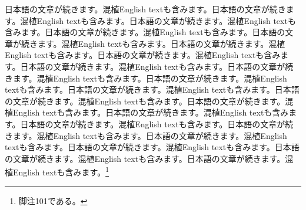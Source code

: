 \documentclass[pdflatex,book]{jlreq}
\begin{document}
日本語の文章が続きます。混植English textも含みます。日本語の文章が続きます。混植English textも含みます。日本語の文章が続きます。混植English textも含みます。日本語の文章が続きます。混植English textも含みます。日本語の文章が続きます。混植English textも含みます。日本語の文章が続きます。混植English textも含みます。日本語の文章が続きます。混植English textも含みます。日本語の文章が続きます。混植English textも含みます。日本語の文章が続きます。混植English textも含みます。日本語の文章が続きます。混植English textも含みます。日本語の文章が続きます。混植English textも含みます。日本語の文章が続きます。混植English textも含みます。日本語の文章が続きます。混植English textも含みます。日本語の文章が続きます。混植English textも含みます。日本語の文章が続きます。混植English textも含みます。日本語の文章が続きます。混植English textも含みます。日本語の文章が続きます。混植English textも含みます。日本語の文章が続きます。混植English textも含みます。日本語の文章が続きます。混植English textも含みます。日本語の文章が続きます。混植English textも含みます。\footnote{脚注101である。}
\end{document}
